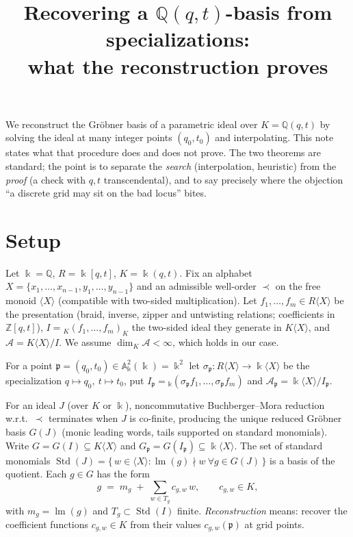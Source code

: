 \documentclass[11pt]{article}
\title{Recovering a $\mathbb{Q}(q,t)$-basis from specializations:\\ what the reconstruction proves}
\author{}
\date{}
\theoremstyle{definition}
\newcommand{\kk}{\Bbbk}
\newcommand{\A}{\mathcal{A}}
\newcommand{\Std}{\operatorname{Std}}
\newcommand{\lm}{\operatorname{lm}}
\newcommand{\pp}{\mathfrak{p}}
\begin{document}
\maketitle

\noindent
We reconstruct the Gr\"obner basis of a parametric ideal over $K=\mathbb{Q}(q,t)$ by solving
the ideal at many integer points $(q_0,t_0)$ and interpolating. This note states what that
procedure does and does not prove. The two theorems are standard; the point is to separate the
\emph{search} (interpolation, heuristic) from the \emph{proof} (a check with $q,t$ transcendental),
and to say precisely where the objection ``a discrete grid may sit on the bad locus'' bites.

\section{Setup}

Let $\kk=\mathbb{Q}$, $R=\kk[q,t]$, $K=\kk(q,t)$. Fix an alphabet
$X=\{x_1,\dots,x_{n-1},y_1,\dots,y_{n-1}\}$ and an admissible well-order $\prec$ on the free monoid
$\langle X\rangle$ (compatible with two-sided multiplication). Let $f_1,\dots,f_m\in R\langle X\rangle$
be the presentation (braid, inverse, zipper and untwisting relations; coefficients in
$\mathbb{Z}[q,t]$), $I={}_K(f_1,\dots,f_m)_K$ the two-sided ideal they generate in $K\langle X\rangle$,
and $\A=K\langle X\rangle/I$. We assume $\dim_K\A<\infty$, which holds in our case.

For a point $\pp=(q_0,t_0)\in\mathbb{A}^2_\kk(\kk)=\kk^2$ let $\sigma_\pp\colon R\langle X\rangle\to
\kk\langle X\rangle$ be the specialization $q\mapsto q_0,\ t\mapsto t_0$, put
$I_\pp={}_\kk(\sigma_\pp f_1,\dots,\sigma_\pp f_m)$ and $\A_\pp=\kk\langle X\rangle/I_\pp$.

For an ideal $J$ (over $K$ or $\kk$), noncommutative Buchberger--Mora reduction w.r.t.\ $\prec$
terminates when $J$ is co-finite, producing the unique reduced Gr\"obner basis $G(J)$ (monic leading
words, tails supported on standard monomials). Write $G=G(I)\subseteq K\langle X\rangle$ and
$G_\pp=G(I_\pp)\subseteq\kk\langle X\rangle$. The set of standard monomials
$\Std(J)=\{\,w\in\langle X\rangle : \lm(g)\nmid w\ \forall g\in G(J)\,\}$ is a basis of the quotient.
Each $g\in G$ has the form
\begin{equation}\label{eq:shape}
  g \;=\; m_g \;+\; \sum_{w\in T_g} c_{g,w}\,w,\qquad c_{g,w}\in K,
\end{equation}
with $m_g=\lm(g)$ and $T_g\subset\Std(I)$ finite. \emph{Reconstruction} means: recover the
coefficient functions $c_{g,w}\in K$ from their values $c_{g,w}(\pp)$ at grid points.
\end{document}

